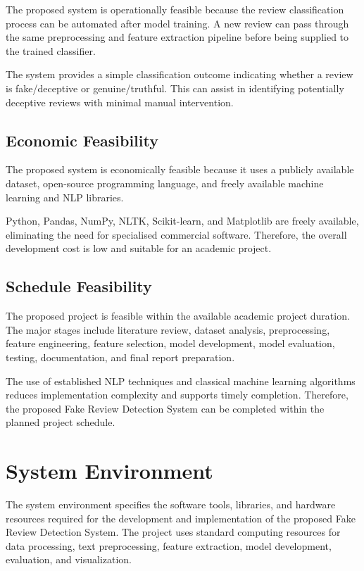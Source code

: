 \documentclass[12pt,a4paper]{report}
\begin{document}
The proposed system is operationally feasible because the review classification process can be automated after model training. A new review can pass through the same preprocessing and feature extraction pipeline before being supplied to the trained classifier.

The system provides a simple classification outcome indicating whether a review is fake/deceptive or genuine/truthful. This can assist in identifying potentially deceptive reviews with minimal manual intervention.

\subsection{Economic Feasibility}

The proposed system is economically feasible because it uses a publicly available dataset, open-source programming language, and freely available machine learning and NLP libraries.

Python, Pandas, NumPy, NLTK, Scikit-learn, and Matplotlib are freely available, eliminating the need for specialised commercial software. Therefore, the overall development cost is low and suitable for an academic project.

\subsection{Schedule Feasibility}

The proposed project is feasible within the available academic project duration. The major stages include literature review, dataset analysis, preprocessing, feature engineering, feature selection, model development, model evaluation, testing, documentation, and final report preparation.

The use of established NLP techniques and classical machine learning algorithms reduces implementation complexity and supports timely completion. Therefore, the proposed Fake Review Detection System can be completed within the planned project schedule.

\section{System Environment}

The system environment specifies the software tools,
libraries, and hardware resources required for the
development and implementation of the proposed Fake
Review Detection System. The project uses standard
computing resources for data processing, text
preprocessing, feature extraction, model development,
evaluation, and visualization.
\end{document}
